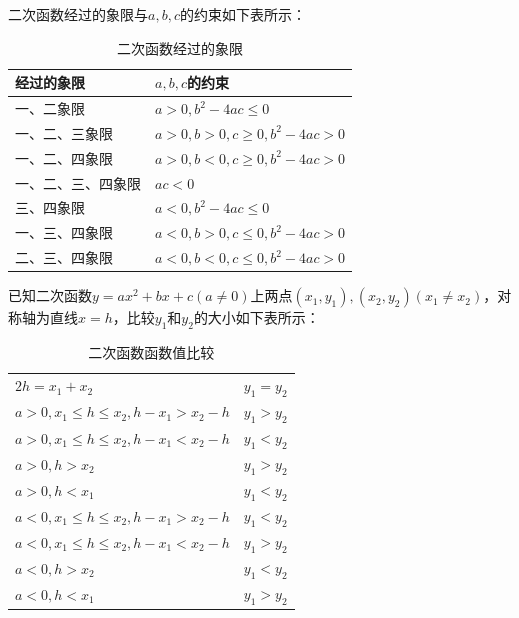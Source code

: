 \documentclass{ecnuthesis}
\begin{document}
\begin{knowledge}
    二次函数经过的象限与$a,b,c$的约束如下表所示：
\end{knowledge}
\begin{table}[H]
\centering
\caption{二次函数经过的象限}
\begin{tabular}{l|l}
\hline
\hline
经过的象限 & $a,b,c$的约束 \\
\hline
一、二象限 & $a>0,b^2-4ac \le 0$ \\
一、二、三象限 & $a>0,b>0,c\ge 0,b^2-4ac>0$ \\
一、二、四象限 & $a>0,b<0,c\ge 0,b^2-4ac>0$ \\
一、二、三、四象限 & $ac<0$ \\
三、四象限 & $a<0,b^2-4ac \le 0$ \\
一、三、四象限 & $a<0,b>0,c \le 0,b^2-4ac>0$ \\
二、三、四象限 & $a<0,b<0,c \le 0,b^2-4ac>0$ \\
\hline
\hline
\end{tabular}
\end{table}
\begin{knowledge}
    已知二次函数$y=ax^2+bx+c(a\ne 0)$上两点$(x_1,y_1),(x_2,y_2)(x_1\ne x_2)$，对称轴为直线$x=h$，比较$y_1$和$y_2$的大小如下表所示：
\end{knowledge}
\begin{table}[H]
\centering
\caption{二次函数函数值比较}
\begin{tabular}{l|l}
\hline
\hline
$2h=x_1+x_2$ & $y_1=y_2$ \\
$a>0, x_1 \le h \le x_2, h-x_1>x_2-h$ & $y_1>y_2$ \\
$a>0, x_1 \le h \le x_2, h-x_1<x_2-h$ & $y_1<y_2$ \\
$a>0, h > x_2$ & $y_1>y_2$ \\
$a>0, h < x_1$ & $y_1<y_2$ \\
$a<0, x_1 \le h \le x_2, h-x_1>x_2-h$ & $y_1<y_2$ \\
$a<0, x_1 \le h \le x_2, h-x_1<x_2-h$ & $y_1>y_2$ \\
$a<0, h > x_2$ & $y_1<y_2$ \\
$a<0, h < x_1$ & $y_1>y_2$ \\
\hline
\hline
\end{tabular}
\end{table}
\clearpage
\end{document}
